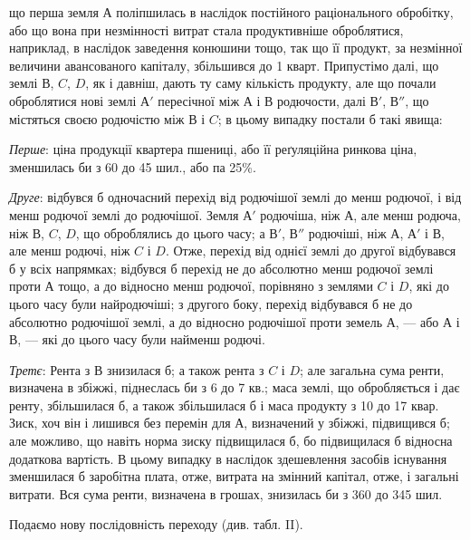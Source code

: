 \parcont{}  %
що перша земля $А$ поліпшилась в наслідок постійного раціонального обробітку,
або що вона при незмінності витрат стала продуктивніше оброблятися,
наприклад, в наслідок заведення конюшини тощо, так що її продукт, за незмінної
величини авансованого капіталу, збільшився до 1 кварт. Припустімо
далі, що землі $В$, $C$, $D$, як і давніш, дають ту саму кількість продукту, але що
почали оброблятися нові землі $А'$ пересічної між $А$ і $В$ родючости, далі $В'$, $В''$, що
містяться своєю родючістю між $В$ і $C$; в цьому випадку постали б такі явища:

\emph{Перше}: ціна продукції квартера пшениці, або її реґуляційна ринкова
ціна, зменшилась би з 60 до 45 шил., або па 25\%.

\emph{Друге}: відбувся б одночасний перехід від родючішої землі до менш
родючої, і від менш родючої землі до родючішої. Земля $А'$ родючіша, ніж $А$, але
менш родюча, ніж $В$, $C$, $D$, що оброблялись до цього часу; а $В'$, $В''$ родючіші, ніж
$А$, $А'$ і $В$, але менш родючі, ніж $C$ і $D$. Отже, перехід від однієї землі до другої
відбувався б у всіх напрямках; відбувся б перехід не до абсолютно
менш родючої землі проти $А$ тощо, а до відносно менш родючої, порівняно
з землями $C$ і $D$, які до цього часу були найродючіші; з другого боку, перехід
відбувався б не до абсолютно родючішої землі, а до відносно родючішої проти
земель $А$, — або $А$ і $В$, — які до цього часу були найменш родючі.

\emph{Третє}: Рента з $В$ знизилася б; а також рента з $C$ і $D$; але загальна
сума ренти, визначена в збіжжі, піднеслась би з 6 до 7 кв.; маса землі, що
обробляється і дає ренту, збільшилася б, а також збільшилася б і маса продукту
з 10 до 17 квар. Зиск, хоч він і лишився без перемін для $А$, визначений у
збіжжі, підвищився б; але можливо, що навіть норма зиску підвищилася б, бо
підвищилася б відносна додаткова вартість. В цьому випадку в наслідок здешевлення
засобів існування зменшилася б заробітна плата, отже, витрата на змінний капітал,
отже, і загальні витрати. Вся сума ренти, визначена в грошах, знизилась би з 360 до 345 шил.

Подаємо нову послідовність переходу
(див. табл. II).

